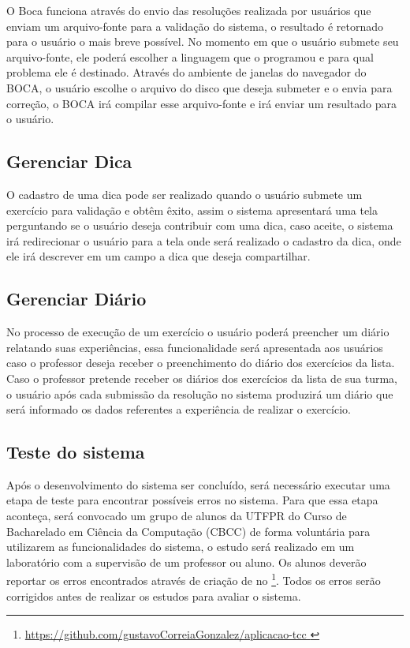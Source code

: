 O Boca funciona através do envio das resoluções realizada por usuários que enviam um arquivo-fonte para a validação do sistema, o resultado é retornado para o usuário o mais breve possível. No momento em que o usuário submete seu arquivo-fonte, ele poderá escolher a linguagem que o programou e para qual problema ele é destinado. Através do ambiente de janelas do navegador do BOCA, o usuário escolhe o arquivo do disco que deseja submeter e o envia para correção, o BOCA irá compilar esse arquivo-fonte e irá enviar um resultado para o usuário.

\subsection{Gerenciar Dica}

O cadastro de uma dica pode ser realizado quando o usuário submete um exercício para validação e obtêm êxito, assim o sistema apresentará uma tela perguntando se o usuário deseja contribuir com uma dica, caso aceite, o sistema irá redirecionar o usuário para a tela onde será realizado o cadastro da dica, onde ele irá descrever em um campo a dica que deseja compartilhar.

\subsection{Gerenciar Diário}

No processo de execução de um exercício o usuário poderá preencher um diário relatando suas experiências, essa funcionalidade será apresentada aos usuários caso o professor deseja receber o preenchimento do diário dos exercícios da lista. Caso o professor pretende receber os diários dos exercícios da lista de sua turma, o usuário após cada submissão da resolução no sistema produzirá um diário que será informado os dados referentes a experiência de realizar o exercício. 

\subsection{Teste do sistema}

Após o desenvolvimento do sistema ser concluído, será necessário executar uma etapa de teste para encontrar possíveis erros no sistema. Para que essa etapa aconteça, será convocado um grupo de alunos da UTFPR do Curso de Bacharelado em Ciência da Computação (CBCC) de forma voluntária para utilizarem as funcionalidades do sistema, o estudo será realizado em um laboratório com a supervisão de um professor ou aluno. Os alunos deverão reportar os erros encontrados através de criação de  no  \footnote{\url{https://github.com/gustavoCorreiaGonzalez/aplicacao-tcc }}. Todos os erros serão corrigidos antes de realizar os estudos para avaliar o sistema.

